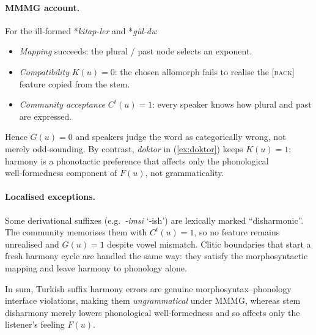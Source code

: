\documentclass[12pt,letterpaper]{article}
\begin{document}
\ea \label{ex:gul-past}
\z
\z

\paragraph{MMMG account.}
For the ill‑formed *\textit{kitap-ler} and *\textit{gül-du}:

\begin{itemize}
\item \emph{Mapping} succeeds: the plural / past node selects an exponent.
\item \emph{Compatibility} $K(u)=0$: the chosen allomorph fails to realise the
      \textsc{[back]} feature copied from the stem.
\item \emph{Community acceptance} $C^t(u)=1$: every speaker knows how plural
      and past are expressed.
\end{itemize}

Hence $G(u)=0$ and speakers judge the word as categorically wrong, not merely
odd‑sounding.  By contrast, \textit{doktor} in (\ref{ex:doktor}) keeps $K(u)=1$;
harmony is a phonotactic preference that affects only the phonological
well‑formedness component of $F(u)$, not grammaticality.

\paragraph{Localised exceptions.}
Some derivational suffixes (e.g.~\textit{-imsi} `‑ish') are lexically
marked ``disharmonic''.  The community memorises them with $C^t(u)=1$, so no
feature remains unrealised and $G(u)=1$ despite vowel mismatch.  Clitic
boundaries that start a fresh harmony cycle \autocite{KabakVogel2001} are
handled the same way: they satisfy the morphosyntactic mapping and leave
harmony to phonology alone.

In sum, Turkish suffix harmony errors are genuine morphosyntax--phonology
interface violations, making them \emph{ungrammatical} under MMMG, whereas
stem disharmony merely lowers phonological well‑formedness and so affects only
the listener's feeling $F(u)$.
\end{document}
